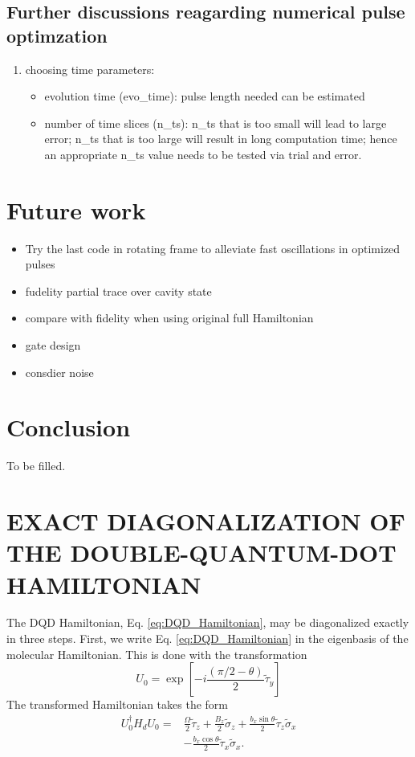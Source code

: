 \documentclass[12pt]{article}
\begin{document}
\subsection{Further discussions reagarding numerical pulse optimzation}
\begin{enumerate}
    \item choosing time parameters: 
        \begin{itemize}
            \item evolution time (evo\_time): pulse length needed can be estimated %
            \item number of time slices (n\_ts): n\_ts that is too small will lead to large error; 
                n\_ts that is too large will result in long computation time; 
                hence an appropriate n\_ts value needs to be tested via trial and error.
        \end{itemize}
\end{enumerate}

\section{Future work}\label{sec:future_work}
\begin{itemize}
    \item Try the last code in rotating frame to alleviate fast oscillations in optimized pulses
    \item fudelity partial trace over cavity state
    \item compare with fidelity when using original full Hamiltonian 
    \item gate design 
    \item consdier noise
\end{itemize}

\section{Conclusion}
To be filled.

\appendix
\section{EXACT DIAGONALIZATION OF THE DOUBLE-QUANTUM-DOT HAMILTONIAN}
The DQD Hamiltonian, Eq. \ref{eq:DQD_Hamiltonian}, may be diagonalized exactly in three steps. 
First, we write Eq. \ref{eq:DQD_Hamiltonian} in the eigenbasis of the molecular Hamiltonian. This is done with the transformation
$$
U_0=\exp \left[-i \frac{(\pi / 2-\theta)}{2} \widetilde{\tau}_y\right]
$$
The transformed Hamiltonian takes the form
$$
\begin{aligned}
U_0^{\dagger} H_d U_0= & \frac{\Omega}{2} \widetilde{\tau}_z+\frac{B_z}{2} \widetilde{\sigma}_z+\frac{b_x \sin \theta}{2} \widetilde{\tau}_z \widetilde{\sigma}_x \\
& -\frac{b_x \cos \theta}{2} \widetilde{\tau}_x \widetilde{\sigma}_x .
\end{aligned}
$$
\end{document}
